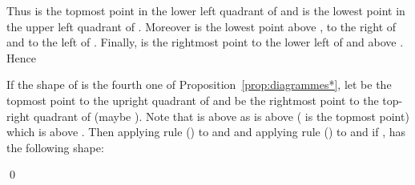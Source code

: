 \documentclass[11pt]{article}
\newenvironment{pf}{{\em \noindent Proof:}}{ \hfill \qed\smallskip}
\newcommand{\rmnum}[1]{\romannumeral #1}
\newcommand{\Vpoint}[2]{\draw (#1,#2) [darkgreen,fill=darkgreen] circle (3pt);}
\newcommand{\Hpoint}[2]{\draw (#1,#2) [darkred,fill=darkred] circle (3pt);}
\newcommand{\zoneRG}[3]{
\draw [very thick,H,Hpoint] (#1,#2) -- +(-#3,0);
\draw [very thick,V,Vpoint] (#1,#2) -- +(0,#3);
\draw [Hfill] (#1,#2) -- +(-#3,#3) -- +(-#3,0);
\draw [Vfill] (#1,#2) -- +(-#3,#3) -- + (0,#3);
}
\newcommand{\zoneGR}[3]{
\draw [very thick,H,Hpoint] (#1,#2) -- +(-#3,0);
\draw [very thick,V,Vpoint] (#1,#2) -- +(0,#3);
\draw [Vfill] (#1,#2) -- +(-#3,#3) -- +(-#3,0);
\draw [Hfill] (#1,#2) -- +(-#3,#3) -- + (0,#3);
}
\begin{document}
\begin{pf}
\begin{minipage}{.15\textwidth}
\end{minipage}
\begin{minipage}{.8\textwidth}
Thus  is the topmost point in the lower left quadrant of  and 
 is the lowest point in the upper left quadrant of . 
Moreover  is the lowest point above , to the right of  and to the left of . 
Finally,  is the rightmost point to the lower left of  and above .
Hence 
\end{minipage}

If the shape of  is the fourth one of Proposition~\ref{prop:diagrammes*},
let  be the topmost point to the upright quadrant of 
and  be the rightmost point to the top-right quadrant of  (maybe ).
Note that  is above  as  is above  ( is the topmost point) which is above .
Then applying rule (\rmnum{2}) to  and 
and applying rule (\rmnum{3}) to  and  if ,  has the following shape:


\end{pf}
\end{document}

